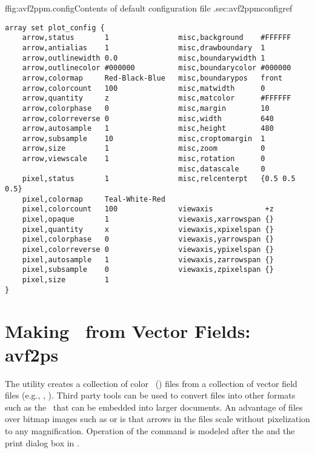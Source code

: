 \begin{codelisting}{f}{fig:avf2ppm.config}{Contents of default configuration
file .}{sec:avf2ppmconfig}{ref}
\begin{verbatim}
array set plot_config {
    arrow,status       1                misc,background    #FFFFFF
    arrow,antialias    1                misc,drawboundary  1
    arrow,outlinewidth 0.0              misc,boundarywidth 1
    arrow,outlinecolor #000000          misc,boundarycolor #000000
    arrow,colormap     Red-Black-Blue   misc,boundarypos   front
    arrow,colorcount   100              misc,matwidth      0
    arrow,quantity     z                misc,matcolor      #FFFFFF
    arrow,colorphase   0                misc,margin        10
    arrow,colorreverse 0                misc,width         640
    arrow,autosample   1                misc,height        480
    arrow,subsample    10               misc,croptomargin  1
    arrow,size         1                misc,zoom          0
    arrow,viewscale    1                misc,rotation      0
                                        misc,datascale     0
    pixel,status       1                misc,relcenterpt   {0.5 0.5 0.5}
    pixel,colormap     Teal-White-Red
    pixel,colorcount   100              viewaxis            +z
    pixel,opaque       1                viewaxis,xarrowspan {}
    pixel,quantity     x                viewaxis,xpixelspan {}
    pixel,colorphase   0                viewaxis,yarrowspan {}
    pixel,colorreverse 0                viewaxis,ypixelspan {}
    pixel,autosample   1                viewaxis,zarrowspan {}
    pixel,subsample    0                viewaxis,zpixelspan {}
    pixel,size         1
}
\end{verbatim}
\end{codelisting}


\section{Making \postscript\ from Vector Fields:
            avf2ps}\label{sec:avf2ps}%

The  utility creates a collection
of color \eps\ () files from a collection of vector field files
(e.g., , ). Third party tools can be used to convert
 files into other formats such as the \pdf\ that can be
embedded into larger documents. An advantage of  files over
bitmap images such as  or  is that arrows in the
 files scale without pixelization to any magnification.
Operation of the  command is modeled after the
{} and the print
dialog box in {}.

